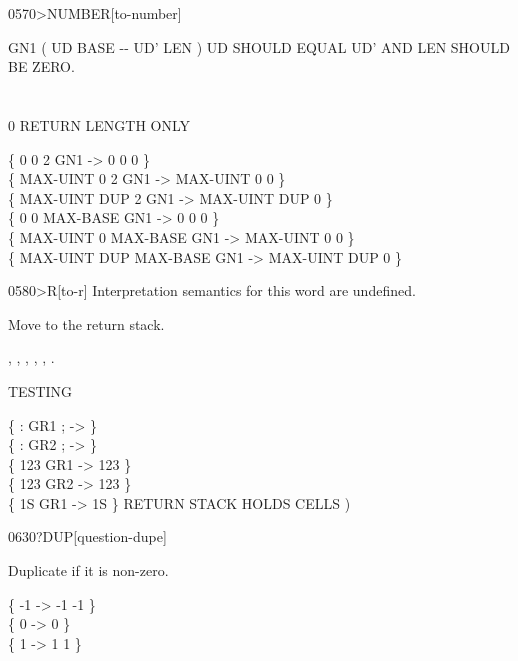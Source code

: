 \begin{worddef}[toNUMBER]{0570}{>NUMBER}[to-number]
\begin{defer}
		\word{:} GN1  ( UD BASE -{}- UD' LEN ) UD SHOULD EQUAL UD' AND LEN SHOULD BE ZERO. \\
		\tab	{}    \word{!} \\
		\tab	{}   \\
		 0     \tab {} RETURN LENGTH ONLY \\
		\tab	{}  \word{!} \word{;}

		\{        0   0        2 GN1 ->        0   0 0 \} \\
		\{ MAX-UINT   0        2 GN1 -> MAX-UINT   0 0 \} \\
		\{ MAX-UINT DUP        2 GN1 -> MAX-UINT DUP 0 \} \\
		\{        0   0 MAX-BASE GN1 ->        0   0 0 \} \\
		\{ MAX-UINT   0 MAX-BASE GN1 -> MAX-UINT   0 0 \} \\
		\{ MAX-UINT DUP MAX-BASE GN1 -> MAX-UINT DUP 0 \}
	\end{defer}
\end{worddef}


\begin{worddef}[toR]{0580}{>R}[to-r]
\interpret
	Interpretation semantics for this word are undefined.

\execute

	Move  to the return stack.

\see {},
	,
	,
	,
	,
	.

	\begin{defer}
	\testing
		TESTING   

		\{ : GR1   ; -> \} \\
		\{ : GR2     ; -> \} \\
		\{ 123 GR1 -> 123 \} \\
		\{ 123 GR2 -> 123 \} \\
		\{ 1S GR1 -> 1S \} \tab[2]  RETURN STACK HOLDS CELLS )
	\end{defer}
\end{worddef}


\begin{worddef}[qDUP]{0630}{?DUP}[question-dupe]
\item {}

	Duplicate  if it is non-zero.

	\begin{defer}
	\testing
		\{ -1  -> -1 -1 \} \\
		\{  0  ->  0    \} \\
		\{  1  ->  1  1 \}
	\end{defer}
\end{worddef}


